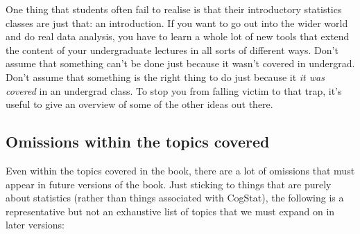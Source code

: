 \documentclass[
  11pt,
  a4paper,
  twoside,symmetric,openright]{book}
\theoremstyle{break}
\theoremstyle{break}
\begin{document}
One thing that students often fail to realise is that their introductory statistics classes are just that: an introduction. If you want to go out into the wider world and do real data analysis, you have to learn a whole lot of new tools that extend the content of your undergraduate lectures in all sorts of different ways. Don't assume that something can't be done just because it wasn't covered in undergrad. Don't assume that something is the right thing to do just because it \emph{it was covered} in an undergrad class. To stop you from falling victim to that trap, it's useful to give an overview of some of the other ideas out there.

\subsection*{Omissions within the topics covered}\label{omissions-within-the-topics-covered}

Even within the topics covered in the book, there are a lot of omissions that must appear in future versions of the book. Just sticking to things that are purely about statistics (rather than things associated with CogStat), the following is a representative but not an exhaustive list of topics that we must expand on in later versions:
\end{document}
